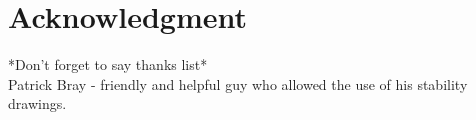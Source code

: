 \section{Acknowledgment}

*Don't forget to say thanks list* \\
Patrick Bray - friendly and helpful guy who allowed the use of his stability drawings. \\